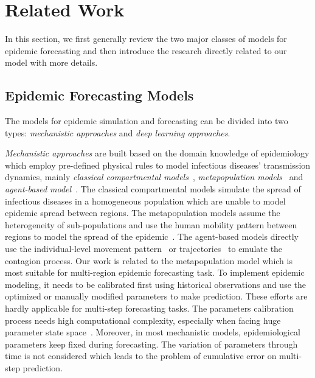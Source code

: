 \documentclass[lettersize,journal]{IEEEtran}
\begin{document}
\section{Related Work}\label{sec:relatedworks}
In this section, we first generally review the two major classes of models for epidemic forecasting and then introduce the research directly related to our model with more details. 

\subsection{Epidemic Forecasting Models}
The models for epidemic simulation and forecasting can be divided into two types: \textit{mechanistic approaches} and \textit{deep learning approaches}.

\textit{Mechanistic approaches} are built based on the domain knowledge of epidemiology which employ pre-defined physical rules to model infectious diseases' transmission dynamics, mainly \textit{classical compartmental models}~\cite{ref_11,ref_12}, \textit{metapopulation models}~\cite{ref_2,ref_13,ref_14,ref_15} and \textit{agent-based model}~\cite{ref_16,ref_17,ref_18}.
The classical compartmental models simulate the
spread of infectious diseases in a homogeneous population which are unable to model epidemic spread between regions.
The metapopulation models assume the heterogeneity of sub-populations and use the human mobility pattern between regions to model the spread of the epidemic~\cite{ref_1,ref_2}. 
The agent-based models directly use the individual-level movement pattern~\cite{ref_16,ref_17} or trajectories~\cite{ref_18} to emulate the contagion process. 
Our work is related to the metapopulation model which is most suitable for multi-region epidemic forecasting task. 
To implement epidemic modeling, it needs to be calibrated first using historical observations and use the optimized or manually modified parameters to make prediction. 
These efforts are hardly applicable for multi-step forecasting tasks. The parameters calibration process needs high computational complexity, especially when facing huge parameter state space~\cite{ref_16,ref_13}. Moreover, in most mechanistic models, epidemiological parameters keep fixed during forecasting. The variation of parameters through time is not considered which leads to the problem of cumulative error on multi-step prediction. 
\end{document}
